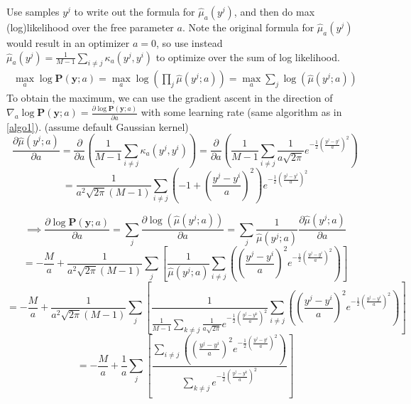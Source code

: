 \documentclass[11pt]{article}
\begin{document}
\begin{enumerate}
\begin{enumerate}
        Use samples $y^j$ to write out the formula for $\hat{\mu}_a(y^j)$, and then do max (log)likelihood over the free parameter $a$. Note the original formula for $\hat{\mu}_a(y^j)$ would result in an optimizer $a=0$, so use instead $\hat{\mu}_a(y^j) = \frac{1}{M-1} \sum_{i\ne j} \kappa_a(y^j,y^i)$ to optimize over the sum of log likelihood.
        \begin{align}
            \max_a \log \mathbf{P}(\mathbf{y}; a) = \max_a \log \left(
            \prod_j \hat{\mu}(y^j;a)
            \right)
            = \max_a \sum_j \log\left(
            \hat{\mu}(y^j;a)
            \right)
        \end{align}
        To obtain the maximum, we can use the gradient ascent in the direction of $\nabla_a \log \mathbf{P}(\mathbf{y}; a) = \frac{\partial \log \mathbf{P}(\mathbf{y}; a)}{\partial a}$ with some learning rate (same algorithm as in \ref{algo1}). (assume default Gaussian kernel)
        $$
        \frac{\partial \hat{\mu}(y^j;a)}{\partial a}
        = \frac{\partial}{\partial a} \left(\frac{1}{M-1} \sum_{i\ne j} \kappa_a(y^j,y^i)\right)
        = \frac{\partial}{\partial a} \left(\frac{1}{M-1} \sum_{i\ne j} \frac{1}{a\sqrt{2\pi}} e^{-\frac{1}{2}(\frac{y^j-y^i}{a})^2}\right)
        $$
        $$
        = \frac{1}{a^2\sqrt{2\pi}(M-1)} \sum_{i\ne j}
        \left(-1 + (\frac{y^j-y^i}{a})^2\right) e^{-\frac{1}{2}(\frac{y^j-y^i}{a})^2}
        $$
        
        $$
        \implies \frac{\partial \log \mathbf{P}(\mathbf{y}; a)}{\partial a}
        = \sum_j \frac{\partial \log \left(\hat{\mu}(y^j;a)\right)}{\partial a}
        = \sum_j \frac{1}{\hat{\mu}(y^j;a)} \frac{\partial \hat{\mu}(y^j;a)}{\partial a}
        $$
        $$
        = -\frac{M}{a} + \frac{1}{a^2\sqrt{2\pi}(M-1)} \sum_j \left[
        \frac{1}{\hat{\mu}(y^j;a)} \sum_{i\ne j} \left(
        (\frac{y^j-y^i}{a})^2 e^{-\frac{1}{2}(\frac{y^j-y^i}{a})^2}
        \right)
        \right]
        $$
        $$
        = -\frac{M}{a} + \frac{1}{a^2\sqrt{2\pi}(M-1)} \sum_j \left[
        \frac{1}{\frac{1}{M-1} \sum_{k\ne j} \frac{1}{a\sqrt{2\pi}} e^{-\frac{1}{2}(\frac{y^j-y^k}{a})^2}} \sum_{i\ne j} \left(
        (\frac{y^j-y^i}{a})^2 e^{-\frac{1}{2}(\frac{y^j-y^i}{a})^2}
        \right)
        \right]
        $$
        $$
        = -\frac{M}{a} + \frac{1}{a} \sum_j \left[
        \frac{\sum_{i\ne j} \left(
        (\frac{y^j-y^i}{a})^2 e^{-\frac{1}{2}(\frac{y^j-y^i}{a})^2}
        \right)}
        {\sum_{k\ne j} e^{-\frac{1}{2}(\frac{y^j-y^k}{a})^2}}
        \right]
        $$
        

\end{enumerate}
\end{enumerate}
\end{document}
